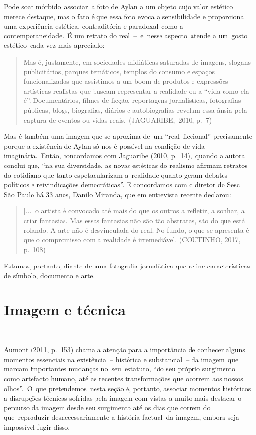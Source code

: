 \documentclass[
  letterpaper,
]{abntex2}
\begin{document}
Pode soar mórbido~associar~a foto de Aylan a um objeto cujo valor
estético merece destaque, mas o fato é que essa foto evoca a
sensibilidade e proporciona uma experiência estética, contraditória e
paradoxal~como a contemporaneidade.~É um retrato do real~--~e~nesse
aspecto~atende a um~gosto estético~cada vez mais apreciado:~ ~

\begin{quote}
Mas é, justamente, em sociedades midiáticas saturadas de imagens,
slogans publicitários, parques temáticos, templos do consumo e espaços
funcionalizados que assistimos a um boom de produtos e expressões
artísticas realistas que buscam representar a realidade ou a ``vida como
ela é''. Documentários, filmes de ficção, reportagens jornalísticas,
fotografias públicas, blogs, biografias, diários e autobiografias
revelam essa ânsia pela captura de eventos ou vidas
reais.~(JAGUARIBE,~2010, p.~7)~
\end{quote}

Mas é também uma imagem que se aproxima de~um ``real~ficcional''
precisamente porque a existência de Aylan só nos é possível na condição
de vida imaginária.~Então, concordamos com Jaguaribe (2010,
p.~14),~quando a autora conclui que, ``na sua diversidade, as novas
estéticas do realismo afirmam retratos do cotidiano que tanto
espetacularizam a~realidade quanto geram debates políticos e
reivindicações democráticas''. E concordamos com o diretor do Sesc São
Paulo há 33 anos, Danilo Miranda, que em entrevista recente declarou:

\begin{quote}
{[}...{]} o artista é convocado até mais do que os outros a refletir, a
sonhar, a criar fantasias. Mas essas fantasias não são tão abstratas,
são do que está rolando. A arte não é desvinculada do real. No fundo, o
que se apresenta é que o compromisso com a realidade é irremediável.
(COUTINHO, 2017, p.~108)
\end{quote}

Estamos, portanto, diante de uma fotografia jornalística que reúne
características de símbolo, documento e arte. ~

\hypertarget{imagem-e-tuxe9cnica}{%
\section{Imagem e técnica}\label{imagem-e-tuxe9cnica}}

~

Aumont (2011, p.~153) chama a atenção para a importância de conhecer
alguns momentos essenciais na existência~-- histórica e substancial~--
da imagem~que marcam importantes mudanças no~seu~estatuto, ``do seu
próprio surgimento como artefacto humano, até as recentes transformações
que ocorrem aos nossos olhos''.~O~que pretendemos~nesta seção é,
portanto, associar momentos históricos a disrupções técnicas sofridas
pela imagem com vistas a muito mais destacar o percurso da imagem desde
seu surgimento até os dias que correm do que~reproduzir
desnecessariamente a história factual~da imagem, embora seja impossível
fugir disso.~
\end{document}
